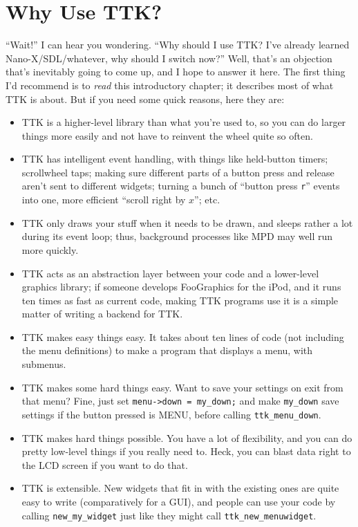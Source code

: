 \documentclass[12pt,letterpaper]{report}
\let\ttt\tt
\def\tt{\def\_{{\ttt\char`\_}}\ttt}
\begin{document}
\section{Why Use TTK?}
``Wait!'' I can hear you wondering. ``Why should I use TTK? I've already learned Nano-X/SDL/whatever,
why should I switch now?'' Well, that's an objection that's inevitably going to come up, and I
hope to answer it here. The first thing I'd recommend is to \emph{read} this introductory chapter;
it describes most of what TTK is about. But if you need some quick reasons, here they are:
\begin{itemize}
\item TTK is a higher-level library than what you're used to, so you can do larger things more
      easily and not have to reinvent the wheel quite so often.
\item TTK has intelligent event handling, with things like held-button timers; scrollwheel taps;
      making sure different parts of a button press and release aren't sent to different widgets;
      turning a bunch of ``button press \verb|r|'' events into one, more efficient ``scroll right by $x$''; etc.
\item TTK only draws your stuff when it needs to be drawn, and sleeps rather a lot during its event
      loop; thus, background processes like MPD may well run more quickly.
\item TTK acts as an abstraction layer between your code and a lower-level graphics library; if
      someone develops FooGraphics for the iPod, and it runs ten times as fast as current code,
      making TTK programs use it is a simple matter of writing a backend for TTK.
\item TTK makes easy things easy. It takes about ten lines of code (not including the menu definitions)
      to make a program that displays a menu, with submenus.
\item TTK makes some hard things easy. Want to save your settings on exit from that menu? Fine, just set
      \verb|menu->down = my_down;| and make \verb|my_down| save settings if the button pressed is MENU,
      before calling \verb|ttk_menu_down|.
\item TTK makes hard things possible. You have a lot of flexibility, and you can do pretty low-level
      things if you really need to. Heck, you can blast data right to the LCD screen if you want to do that.
\item TTK is extensible. New widgets that fit in with the existing ones are quite easy to write (comparatively
      for a GUI), and people can use your code by calling \verb|new_my_widget| just like they might call
      \verb|ttk_new_menu|\discretionary{{\tt \_}}{}{}\verb|widget|.
\end{itemize}
\end{document}
